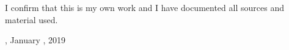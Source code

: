 \thispagestyle{empty}
\vspace*{0.8\textheight}
\noindent
I confirm that this \MakeLowercase{\getDoctype{}} is my own work and I have documented all sources and material used.

\vspace{15mm}
\noindent
\getSubmissionLocation{}, January \hspace{10mm}, 2019 \hspace{50mm} \getAuthor{}

\cleardoublepage{}


